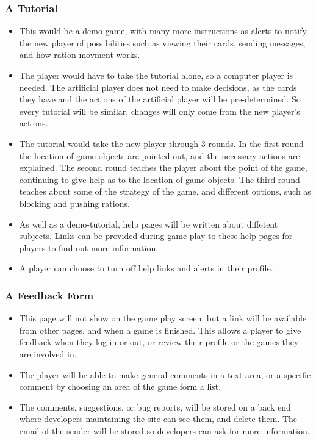 	\subsubsection{A Tutorial}
	  \begin{itemize}
	  	\item This would be a demo game, with many more instructions as alerts to notify the new player of possibilities such as viewing their cards, sending messages, and how ration movment works.
	  	\item The player would have to take the tutorial alone, so a computer player is needed. The artificial player does not need to make decisions, as the cards they have and the actions of the artificial player will be pre-determined. So every tutorial will be similar, changes will only come from the new player's actions.
	  	\item The tutorial would take the new player through 3 rounds. In the first round the location of game objects are pointed out, and the necessary actions are explained. The second round teaches the player about the point of the game, continuing to give help as to the location of game objects. The third round teaches about some of the strategy of the game, and different options, such as blocking and pushing rations.
	  	\item As well as a demo-tutorial, help pages will be written about diffetent subjects. Links can be provided during game play to these help pages for players to find out more information.
	  	\item A player can choose to turn off help links and alerts in their profile.
	  \end{itemize}
	\subsubsection{A Feedback Form}
	  \begin{itemize}
	  	\item This page will not show on the game play screen, but a link will be available from other pages, and when a game is finished. This allows a player to give feedback when they log in or out, or review their profile or the games they are involved in.
	  	\item The player will be able to make general comments in a text area, or a specific comment by choosing an area of the game form a list.
	  	\item The comments, suggestions, or bug reports, will be stored on a back end where developers maintaining the site can see them, and delete them. The email of the sender will be stored so developers can ask for more information.
	  \end{itemize}